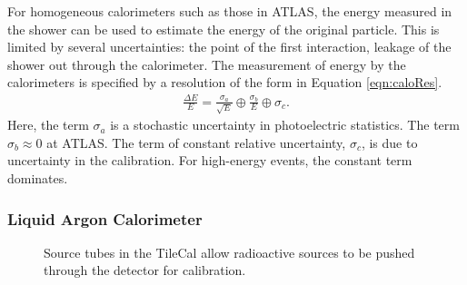 For homogeneous calorimeters such as those in ATLAS, the energy measured in the shower can be used to estimate the energy of the original particle.
This is limited by several uncertainties: the point of the first interaction, leakage of the shower out through the calorimeter.
The measurement of energy by the calorimeters is specified by a resolution of the form in Equation \ref{eqn:caloRes}.
\begin{equation}\begin{split}\label{eqn:caloRes}
    \frac{\Delta E}{E}=\frac{\sigma_a}{\sqrt{E}}\oplus\frac{\sigma_b}{E}\oplus\sigma_c.
\end{split}\end{equation} 
Here, the term $\sigma_a$ is a stochastic uncertainty in photoelectric statistics.
The term $\sigma_b\approx0$ at ATLAS.
The term of constant relative uncertainty, $\sigma_c$, is due to uncertainty in the calibration.
For high-energy events, the constant term dominates.

\subsubsection{Liquid Argon Calorimeter}

\begin{figure}[h!]
\captionsetup[subfigure]{position=b}
\centering
{}
\caption{Source tubes in the TileCal allow radioactive sources to be pushed through the detector for calibration.}
\label{fig:atlasCalo}
\end{figure}

